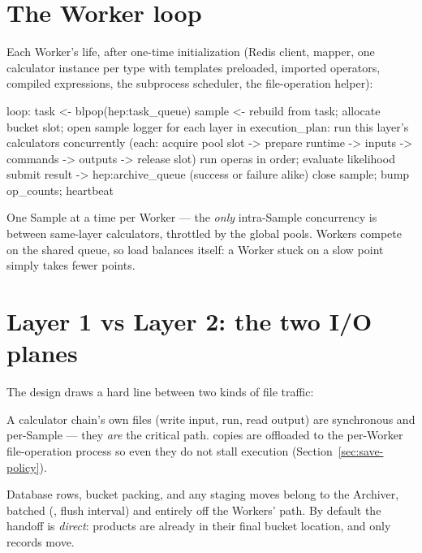 \section{The Worker loop}
\label{sec:worker-loop}

Each Worker's life, after one-time initialization (Redis client, mapper, one calculator
instance per type with templates preloaded, imported operators, compiled expressions,
the subprocess scheduler, the file-operation helper):

\begin{plaincode}
loop:
  task <- blpop(hep:task_queue)
  sample <- rebuild from task; allocate bucket slot; open sample logger
  for each layer in execution_plan:
      run this layer's calculators concurrently
        (each: acquire pool slot -> prepare runtime -> inputs ->
         commands -> outputs -> release slot)
  run operas in order; evaluate likelihood
  submit result -> hep:archive_queue        (success or failure alike)
  close sample; bump op_counts; heartbeat
\end{plaincode}

One Sample at a time per Worker --- the \emph{only} intra-Sample concurrency is between
same-layer calculators, throttled by the global pools. Workers compete on the shared
queue, so load balances itself: a Worker stuck on a slow point simply takes fewer
points.

\section{Layer 1 vs Layer 2: the two I/O planes}
\label{sec:two-layers}

The design draws a hard line between two kinds of file traffic:

\begin{description}[style=nextline, leftmargin=1.2em]
  \item[Layer 1 --- inside the Sample.] A calculator chain's own files (write input,
        run, read output) are synchronous and per-Sample --- they \emph{are} the
        critical path.  copies are offloaded to the per-Worker
        file-operation process so even they do not stall execution
        (Section~\ref{sec:save-policy}).
  \item[Layer 2 --- after the Sample.] Database rows, bucket packing, and any staging
        moves belong to the Archiver, batched (, flush
        interval) and entirely off the Workers' path. By default the handoff is
        \emph{direct}: products are already in their final bucket location, and only
        records move.
\end{description}

